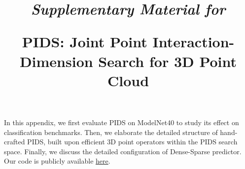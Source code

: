 \documentclass[10pt,twocolumn,letterpaper]{article}
\begin{document}
\title{
\textit{Supplementary Material for}

PIDS: Joint Point Interaction-Dimension Search for 3D Point Cloud

}


\maketitle
\thispagestyle{empty}

\setcounter{section}{9}
\setcounter{table}{8}
\setcounter{figure}{4}

 
In this appendix, we first evaluate PIDS on ModelNet40 to study its effect on classification benchmarks.
Then, we elaborate the detailed structure of hand-crafted PIDS, built upon efficient 3D point operators within the PIDS search space.
Finally, we discuss the detailed configuration of Dense-Sparse predictor. Our code is publicly available \href{https://github.com/lordzth666/WACV23_PIDS-Joint-Point-Interaction-Dimension-Search-for-3D-Point-Cloud}{here}.
\end{document}
